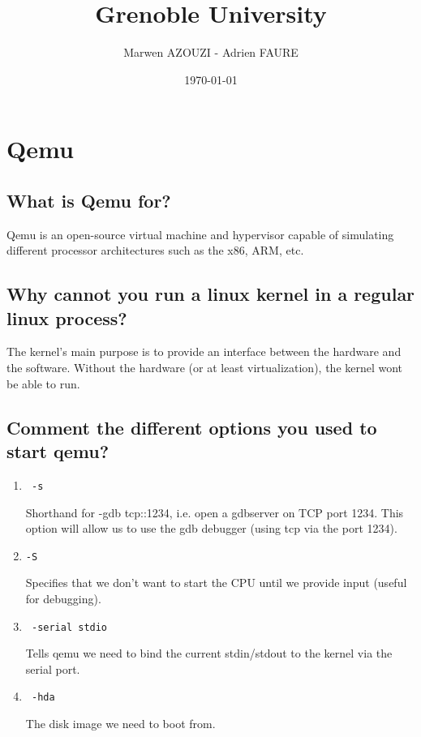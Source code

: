 \documentclass[10]{article}
\begin{document}
\title{Grenoble University}
\author{Marwen AZOUZI - Adrien FAURE}
\date{\today}
\maketitle

\section{Qemu}

\subsection{What is Qemu for?}
Qemu is an open-source virtual machine and hypervisor capable of simulating different processor architectures such as the x86, ARM, etc.
\subsection{Why cannot you run a linux kernel in a regular linux process?}
The kernel's main purpose is to provide an interface between the hardware and the software. Without the hardware (or at least virtualization), the  kernel wont be able to run.
\subsection{Comment the different options you used to start qemu?}
\begin{enumerate}
	\item
		\begin{verbatim} -s \end{verbatim}
		 Shorthand for -gdb tcp::1234, i.e. open a gdbserver on TCP port 1234.
		This option will allow us to use the gdb debugger (using tcp via the port 1234).
	\item
		\begin{verbatim}-S \end{verbatim}
		Specifies that we don't want to start the CPU until we provide input (useful for debugging).
	\item \begin{verbatim} -serial stdio \end{verbatim}
		Tells qemu we need to bind the current stdin/stdout to the kernel via the serial port.
	\item
		\begin{verbatim} -hda \end{verbatim}
		The disk image we need to boot from.

\end{enumerate}
\end{document}

